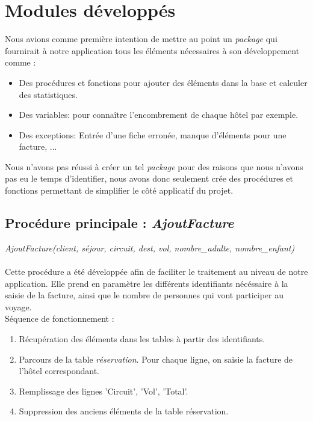 \section{Modules d\'evelopp\'es}
Nous avions comme premi\`ere intention de mettre au point un \textit{package} qui fournirait \`a notre application tous les \'el\'ements n\'ecessaires \`a son d\'eveloppement comme : \\

\begin{itemize}
\item Des proc\'edures et fonctions pour ajouter des \'el\'ements dans la base et calculer des statistiques.
\item Des variables: pour conna\^itre l'encombrement de chaque h\^otel par exemple.
\item Des exceptions: Entr\'ee d'une fiche erron\'ee, manque d'\'el\'ements pour une facture, ... \\
\end{itemize}

Nous n'avons pas r\'eussi \`a cr\'eer un tel \textit{package} pour des raisons que nous n'avons pas eu le temps d'identifier, nous avons donc seulement cr\'ee des proc\'edures et fonctions permettant de simplifier le c\^ot\'e applicatif du projet.

\subsection{Proc\'edure principale : \textit{AjoutFacture}}

\textit{AjoutFacture(client, s\'ejour, circuit, dest, vol, nombre\_adulte, nombre\_enfant)}\\ \\
Cette proc\'edure a \'et\'e d\'evelopp\'ee afin de faciliter le traitement au niveau de notre application.
Elle prend en param\`etre les diff\'erents identifiants n\'ec\'essaire \`a la saisie de la facture, ainsi que le nombre de personnes qui vont participer au voyage.\\

S\'equence de fonctionnement :
\begin{enumerate}[1]
\item R\'ecup\'eration des \'el\'ements dans les tables \`a partir des identifiants.
\item Parcours de la table \textit{r\'eservation}. Pour chaque ligne, on saisie la facture de l'h\^otel correspondant.
\item Remplissage des lignes 'Circuit', 'Vol', 'Total'.
\item Suppression des anciens \'el\'ements de la table r\'eservation.

\end{enumerate}

